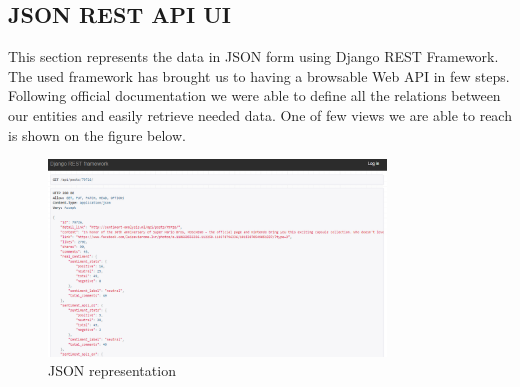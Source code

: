 \newpage

\subsection{JSON REST API UI}

This section represents the data in JSON form using Django REST Framework. The used framework has brought us to having a browsable Web API in few steps. Following official documentation we were able to define all the relations between our entities and easily retrieve needed data. One of few views we are able to reach is shown on the figure below.

\begin{figure}[ht]
	\centering
	\includegraphics[width=0.8\textwidth]{04-framework/03-user-interface/images/django_api.png}
	\caption[JSON representation]{JSON representation \label{fig:django-api}}
\end{figure}